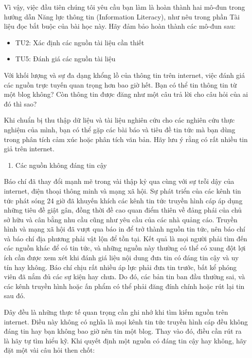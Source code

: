 Vì vậy, việc đầu tiên chúng tôi yêu cầu bạn làm là hoàn thành hai mô-đun trong hướng dẫn Năng lực thông tin (Information Literacy), như nêu trong phần Tài liệu đọc bắt buộc của bài học này. Hãy đảm bảo hoàn thành các mô-đun sau:

\begin{itemize}
\item
  TU2: Xác định các nguồn tài liệu cần thiết
\item
  TU5: Đánh giá các nguồn tài liệu
\end{itemize}

Với khối lượng và sự đa dạng khổng lồ của thông tin trên internet, việc đánh giá các nguồn trực tuyến quan trọng hơn bao giờ hết. Bạn có thể tin thông tin từ một blog không? Còn thông tin được đăng như một câu trả lời cho câu hỏi của ai đó thì sao?

Khi chuẩn bị thu thập dữ liệu và tài liệu nghiên cứu cho các nghiên cứu thực nghiệm của mình, bạn có thể gặp các bài báo và tiêu đề tin tức mà bạn dùng trong phân tích cảm xúc hoặc phân tích văn bản. Hãy lưu ý rằng có rất nhiều tin giả trên internet.

\begin{enumerate}
\def\labelenumi{\arabic{enumi}.}
\setcounter{enumi}{2}
\item
  Các nguồn không đáng tin cậy
\end{enumerate}

Báo chí đã thay đổi mạnh mẽ trong vài thập kỷ qua cùng với sự trỗi dậy của internet, điện thoại thông minh và mạng xã hội. Sự phát triển của các kênh tin tức phát sóng 24 giờ đã khuyến khích các kênh tin tức truyền hình cáp áp dụng những tiêu đề giật gân, đồng thời đề cao quan điểm thiên về đảng phái của chủ sở hữu và cân bằng nhu cầu cũng như yêu cầu của các nhà quảng cáo. Truyền hình và mạng xã hội đã vượt qua báo in để trở thành nguồn tin tức, nên báo chí và báo chí địa phương phải vật lộn để tồn tại. Kết quả là mọi người phải tìm đến các nguồn khác để có tin tức, và những nguồn này thường có thể có xung đột lợi ích cần được xem xét khi đánh giá liệu nội dung đưa tin có đáng tin cậy và uy tín hay không. Báo chí chịu rất nhiều áp lực phải đưa tin trước, bất kể phóng viên đã nắm đủ các sự kiện hay chưa. Do đó, các bản tin ban đầu thường sai, và các kênh truyền hình hoặc ấn phẩm có thể phải đăng đính chính hoặc rút lại tin sau đó.

Đây đều là những thực tế quan trọng cần ghi nhớ khi tìm kiếm nguồn trên internet. Điều này không có nghĩa là mọi kênh tin tức truyền hình cáp đều không đáng tin hay bạn không bao giờ nên tin một blog. Thay vào đó, điều cần rút ra là hãy tự tìm hiểu kỹ. Khi quyết định một nguồn có đáng tin cậy hay không, hãy đặt một vài câu hỏi then chốt:

